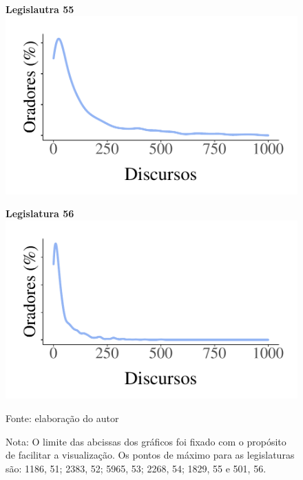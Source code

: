 \documentclass[
12pt,				%
openright,			%
twoside,			%
a4paper,			%
english,			%
french,				%
spanish,			%
brazil				%
]{abntex2}
\begin{document}
\begin{figure}[!htb]
\begin{minipage}[b]{0.3\textwidth}
	\end{minipage}
	\\
	\hspace{.05\linewidth}
	\begin{minipage}[b]{0.3\textwidth}
		\textbf{Legislautra 55}
		\label{fig:dens_legis_55}
		\centering
		\includegraphics[width=1\linewidth]{figures/dens_oradores_55}
		
	\end{minipage}
	\hspace{.05\linewidth}
	\begin{minipage}[b]{0.3\textwidth}
		\textbf{Legislatura 56}
		\label{fig:dens_legis_56}
		\centering
		\includegraphics[width=1\linewidth]{figures/dens_oradores_56}
		
	\end{minipage}	

	Fonte: elaboração do autor
	\begin{flushleft}
		Nota: O limite das abcissas dos gráficos foi fixado com o propósito de facilitar a visualização. Os pontos de máximo para as legislaturas são: 1186, 51; 2383, 52; 5965, 53; 2268, 54; 1829, 55 e 501, 56. 
	\end{flushleft} 
\end{figure}
\end{document}
